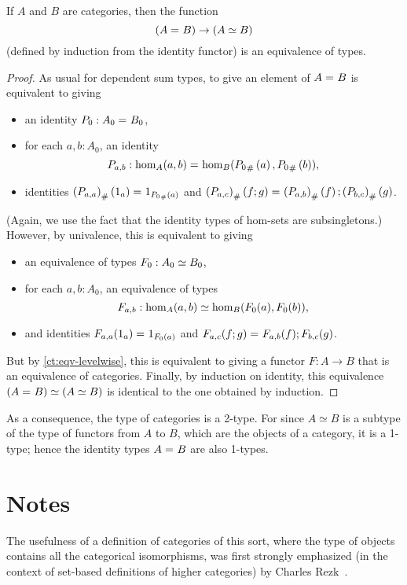 \begin{thm}\label{ct:cat-2cat}
  If $A$ and $B$ are categories, then the function
  \[(A =_{} B) \to (A\simeq B)\]
  (defined by induction from the identity functor) is an equivalence of types.
\end{thm}
\begin{proof}
  As usual for dependent sum types, to give an element of $A =_{} B$ is equivalent to giving
  \begin{itemize}
  \item an identity $P_0:A_0 =_{} B_0$,
  \item for each $a,b:A_0$, an identity
    \[P_{a,b}:\hom_A(a,b) =_{} \hom_B({P_0}_{\#}\left({a}\right),{P_0}_{\#}\left({b}\right)),\]
  \item identities ${(P_{a,a})}_{\#}\left({1_a}\right) =_{} 1_{{P_0}_{\#}\left({a}\right)}$ and ${(P_{a,c})}_{\#}\left({f;g}\right) =_{} {(P_{a,b})}_{\#}\left({f}\right);{(P_{b,c})}_{\#}\left({g}\right)$.
  \end{itemize}
  (Again, we use the fact that the identity types of hom-sets are subsingletons.)
  However, by univalence, this is equivalent to giving
  \begin{itemize}
  \item an equivalence of types $F_0:A_0 \simeq B_0$,
  \item for each $a,b:A_0$, an equivalence of types
    \[F_{a,b}:\hom_A(a,b) \simeq \hom_B(F_0 (a),F_0 (b)),\]
  \item and identities $F_{a,a}(1_a) =_{} 1_{F_0 (a)}$ and $F_{a,c}(f;g) =_{} F_{a,b} (f);F_{b,c} (g)$.
  \end{itemize}
  But by \autoref{ct:eqv-levelwise}, this is equivalent to giving a functor $F:A\to B$ that is an equivalence of categories.  Finally, by induction on identity, this equivalence $(A =_{} B) \simeq (A\simeq B)$ is identical to the one obtained by induction.
\end{proof}

As a consequence, the type of categories is a 2-type.  For since $A\simeq B$ is a subtype of the type of functors from $A$ to $B$, which are the objects of a category, it is a 1-type; hence the identity types $A =_{} B$ are also 1-types.

\section*{Notes}
\label{sec:ct:notes}

The usefulness of a definition of categories of this sort, where the type of objects contains all the categorical isomorphisms, was first strongly emphasized (in the context of set-based definitions of higher categories) by Charles Rezk~\cite{rezk01css}.

